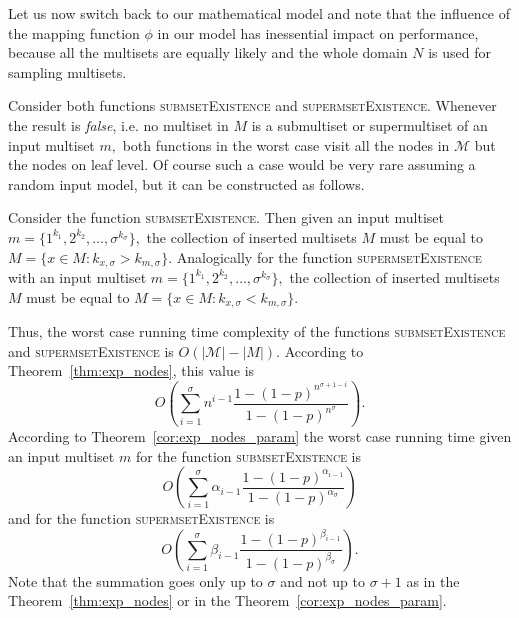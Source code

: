 Let us now switch back to our mathematical model and note that the influence 
of the mapping function $\phi$ in our model has inessential impact on performance, 
because all the multisets are equally likely and the whole domain $N$ is used for 
sampling multisets. 

Consider both functions \textsc{submsetExistence} and \textsc{supermsetExistence}. 
Whenever the result is \emph{false}, i.e. no multiset in $M$ is 
a submultiset or supermultiset of an input multiset $m,$ both functions in the 
worst case visit all the nodes in $\mathcal{M}$ but the nodes on leaf level. 
Of course such a case would be very rare assuming a random input model, but 
it can be constructed as follows. 

Consider the function \textsc{submsetExistence}. Then given an input multiset 
$m = \{ 1^{k_1}, 2^{k_2}, \ldots, \sigma^{k_\sigma} \},$ the collection of inserted 
multisets $M$ must be equal to $M = \{ x\in M : k_{x,\sigma} > k_{m,\sigma} \}.$ 
Analogically for the function \textsc{supermsetExistence} with an input multiset 
$m = \{ 1^{k_1}, 2^{k_2}, \ldots, \sigma^{k_\sigma} \},$ the collection of inserted 
multisets $M$ must be equal to $M = \{ x\in M : k_{x,\sigma} < k_{m,\sigma} \}.$ 

Thus, the worst case running time complexity of the functions 
\textsc{submsetExistence} and \textsc{supermsetExistence} is $O(|\mathcal{M}| - |M|).$ 
According to Theorem~\ref{thm:exp_nodes}, this value is 
\begin{equation*}
O(\sum_{i=1}^{\sigma} n^{i-1} \frac{1-(1-p)^{n^{\sigma +1 -i}}}{1-(1-p)^{n^{\sigma}}}).
\end{equation*}
According to Theorem~\ref{cor:exp_nodes_param} the worst case running 
time given an input multiset $m$ for the function \textsc{submsetExistence} is 
\begin{equation*}
O(\sum_{i=1}^{\sigma} \alpha_{i-1} \frac{1-(1-p)^{\alpha_{i-1}}}{1-(1-p)^{\alpha_{\sigma}}})
\end{equation*}
and for the function \textsc{supermsetExistence} is 
\begin{equation*}
O(\sum_{i=1}^{\sigma} \beta_{i-1} \frac{1-(1-p)^{\beta_{i-1}}}{1-(1-p)^{\beta_{\sigma}}}).
\end{equation*}
Note that the summation goes only up to $\sigma$ and not up to $\sigma + 1$ as 
in the Theorem~\ref{thm:exp_nodes} or in the Theorem~\ref{cor:exp_nodes_param}.

